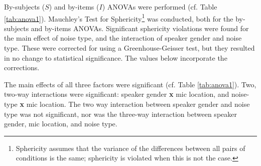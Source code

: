 By-subjects ($S$) and by-items ($I$) ANOVAs were performed (cf. Table \ref{tab:anova1}). Mauchley's Test for Sphericity\footnote{Sphericity assumes that the variance of the differences between all pairs of conditions is the same; sphericity is violated when this is not the case.} was conducted, both for the by-subjects and by-items ANOVAs.  Significant sphericity violations were found for the main effect of noise type, and the interaction of speaker gender and noise type.  These were corrected for using a Greenhouse-Geisser test, but they resulted in no change to statistical significance.  The values below incorporate the corrections.


The main effects of all three factors were significant (cf. Table \ref{tab:anova1}).  Two, two-way interactions were significant: speaker gender \textbf{x} mic location, and noise-type \textbf{x} mic location. The two way interaction between speaker gender and noise type was not significant, nor was the three-way interaction between speaker gender, mic location, and noise type.


